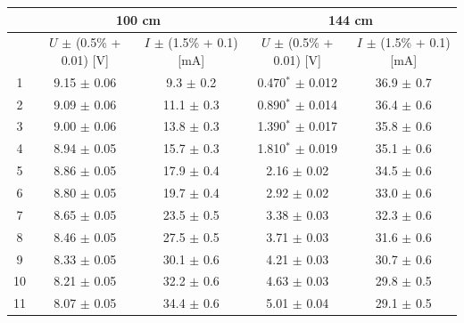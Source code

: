 \documentclass[a4paper]{article}
\begin{document}
\begin{table}[H]
	\centering
	\begin{tabular}{ccc||cc}
		\hline
		   & \multicolumn{2}{c||}{100 cm} & \multicolumn{2}{c}{144 cm}                                                                                       \\
		\hline
		   & $U$ $\pm$ (0.5\% + 0.01) [V] & $I$ $\pm$ (1.5\% + 0.1) [mA]           & $U$ $\pm$ (0.5\% + 0.01) [V]             & $I$ $\pm$ (1.5\% + 0.1) [mA] \\
		\hline
		1  & 9.15 $\pm$ 0.06              & 9.3                          $\pm$ 0.2 & 0.470$^*$                         $\pm$ 0.012 & 36.9 $\pm$ 0.7               \\
		2  & 9.09 $\pm$ 0.06              & 11.1                         $\pm$ 0.3 & 0.890$^*$                         $\pm$ 0.014 & 36.4 $\pm$ 0.6               \\
		3  & 9.00 $\pm$ 0.06              & 13.8                         $\pm$ 0.3 & 1.390$^*$                         $\pm$ 0.017 & 35.8 $\pm$ 0.6               \\
		4  & 8.94 $\pm$ 0.05              & 15.7                         $\pm$ 0.3 & 1.810$^*$                         $\pm$ 0.019 & 35.1 $\pm$ 0.6               \\
		5  & 8.86 $\pm$ 0.05              & 17.9                         $\pm$ 0.4 & 2.16                         $\pm$ 0.02  & 34.5 $\pm$ 0.6               \\
		6  & 8.80 $\pm$ 0.05              & 19.7                         $\pm$ 0.4 & 2.92                         $\pm$ 0.02  & 33.0 $\pm$ 0.6               \\
		7  & 8.65 $\pm$ 0.05              & 23.5                         $\pm$ 0.5 & 3.38                         $\pm$ 0.03  & 32.3 $\pm$ 0.6               \\
		8  & 8.46 $\pm$ 0.05              & 27.5                         $\pm$ 0.5 & 3.71                         $\pm$ 0.03  & 31.6 $\pm$ 0.6               \\
		9  & 8.33 $\pm$ 0.05              & 30.1                         $\pm$ 0.6 & 4.21                         $\pm$ 0.03  & 30.7 $\pm$ 0.6               \\
		10 & 8.21 $\pm$ 0.05              & 32.2                         $\pm$ 0.6 & 4.63                         $\pm$ 0.03  & 29.8 $\pm$ 0.5               \\
		11 & 8.07 $\pm$ 0.05              & 34.4                         $\pm$ 0.6 & 5.01                         $\pm$ 0.04  & 29.1 $\pm$ 0.5               \\

\end{tabular}
\end{table}
\end{document}
